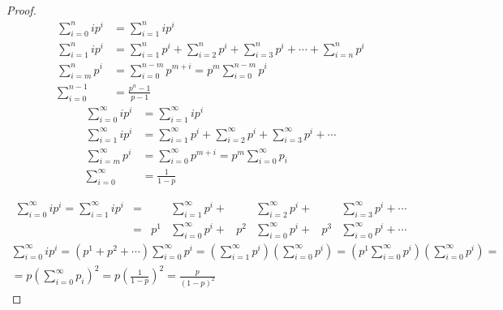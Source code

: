 \documentclass{article}
\newcommand{\parenthesed}[1]{\left(#1\right)}
\begin{document}
	\begin{proof}
		\begin{align}
			\sum_{i=0}^n ip^i &= \sum_{i=1}^n ip^i\\
			\sum_{i=1}^n ip^i &= \sum_{i=1}^n p^i + \sum_{i=2}^n p^i + \sum_{i=3}^n p^i + \cdots + \sum_{i=n}^n p^i\\
			\sum_{i=m}^n p^i        &= \sum_{i=0}^{n-m} p^{m+i} = p^m \sum_{i=0}^{n-m}p^i\\
			\sum_{i=0}^{n-1}        &= \frac{p^n-1}{p-1}
		\end{align}
		\begin{align}
			\sum_{i=0}^\infty ip^i &= \sum_{i=1}^\infty ip^i\\
			\sum_{i=1}^\infty ip^i &= \sum_{i=1}^\infty p^i + \sum_{i=2}^\infty p^i + \sum_{i=3}^\infty p^i + \cdots\\
			\sum_{i=m}^\infty p^i  &= \sum_{i=0}^\infty p^{m+i} = p^m\sum_{i=0}^\infty p_i\\
			\sum_{i=0}^\infty      &= \frac1{1-p}
		\end{align}
		\begin{comment}
			\begin{align}
				\sum_{i=0}^\infty ip^i = \sum_{i=1}^\infty ip^i &= &  &    & &\sum_{i=1}^\infty p^i + {} &    &\sum_{i=2}^\infty p^i + {} &    &\sum_{i=3}^\infty p^i + \cdots\\
							                        &= &  &p^1 & &\sum_{i=0}^\infty p^i + {} & p^2&\sum_{i=0}^\infty p^i + {} & p^3&\sum_{i=0}^\infty p^i + \cdots\\
							                        &= & (&p^1 & &{}                    + {} & &p^2&{} + &p^3 + \cdots)\sum
			\end{align}
		\end{comment}
		\begin{align}
			\sum_{i=0}^\infty ip^i = \sum_{i=1}^\infty ip^i &= &    &\sum_{i=1}^\infty p^i + {} &    &\sum_{i=2}^\infty p^i + {} &    &\sum_{i=3}^\infty p^i + \cdots\\
					                                &= & p^1&\sum_{i=0}^\infty p^i + {} & p^2&\sum_{i=0}^\infty p^i + {} & p^3&\sum_{i=0}^\infty p^i + \cdots
		\end{align}
		\begin{multline}
			\sum_{i=0}^\infty ip^i = \parenthesed{p^1 + p^2 + \cdots}\sum_{i=0}^\infty p^i = \parenthesed{\sum_{i=1}^\infty p^i} \parenthesed{\sum_{i=0}^\infty p^i} = \parenthesed{p^1\sum_{i=0}^\infty p^i} \parenthesed{\sum_{i=0}^\infty p^i}=\\
			= p\parenthesed{\sum_{i=0}^\infty p_i}^2 = p\parenthesed{\frac1{1-p}}^2 = \frac p{\parenthesed{1-p}^2}
		\end{multline}
	\end{proof}
\end{document}
